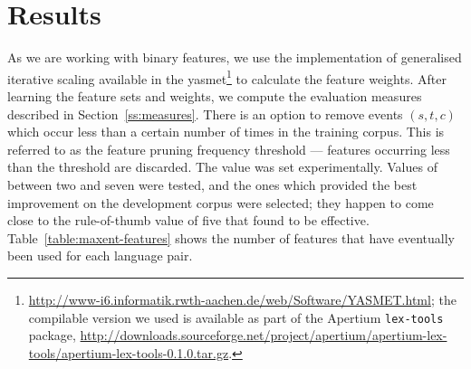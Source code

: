 \documentclass[11pt]{article}
\newcommand{\todomlf}[1]{\renewcommand{\baselinestretch}{0.55}\todo{\scriptsize\sf MLF: #1}\renewcommand{\baselinestretch}{1.0}}
\begin{document}
\section{Results}
\label{sec:eval-ref-results}

As we are working with binary features, we use the implementation of
generalised iterative scaling available in the {\sc
  yasmet}\footnote{\url{http://www-i6.informatik.rwth-aachen.de/web/Software/YASMET.html};
  the compilable version we used is available as part of the Apertium
  \texttt{lex-tools} package,
  \url{http://downloads.sourceforge.net/project/apertium/apertium-lex-tools/apertium-lex-tools-0.1.0.tar.gz}.}
to calculate the feature weights.  %
After learning the
feature sets and weights, we compute the evaluation measures described
in Section~\ref{ss:measures}. There is an option to remove events $(s,
t, c)$ which occur less than a certain number of times in the training
corpus. This is referred to as the feature pruning frequency threshold
--- features occurring less than the threshold are discarded. The value
was set experimentally. Values of between two and seven were tested,
and the ones which provided the best improvement on the development
corpus were selected; they happen to come close to the rule-of-thumb
value of five that \citet[p.~596]{Manning99b} found to be effective.
Table~\ref{table:maxent-features} shows the number of features that
have eventually been used for each language pair.

\end{document}
